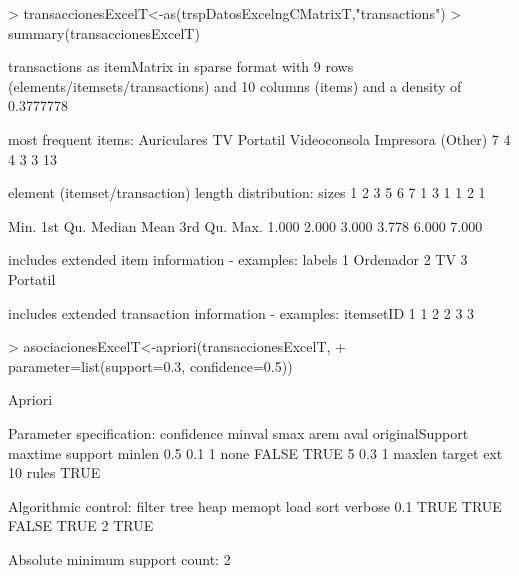 \documentclass [a4paper] {article}
\begin{document}
\begin{Schunk}
\begin{Sinput}
> transaccionesExcelT<-as(trspDatosExcelngCMatrixT,"transactions")
> summary(transaccionesExcelT)
\end{Sinput}
\begin{Soutput}
transactions as itemMatrix in sparse format with
 9 rows (elements/itemsets/transactions) and
 10 columns (items) and a density of 0.3777778 

most frequent items:
 Auriculares           TV     Portatil Videoconsola    Impresora      (Other) 
           7            4            4            3            3           13 

element (itemset/transaction) length distribution:
sizes
1 2 3 5 6 7 
1 3 1 1 2 1 

   Min. 1st Qu.  Median    Mean 3rd Qu.    Max. 
  1.000   2.000   3.000   3.778   6.000   7.000 

includes extended item information - examples:
     labels
1 Ordenador
2        TV
3  Portatil

includes extended transaction information - examples:
  itemsetID
1         1
2         2
3         3
\end{Soutput}
\begin{Sinput}
> asociacionesExcelT<-apriori(transaccionesExcelT,
+ parameter=list(support=0.3, confidence=0.5))
\end{Sinput}
\begin{Soutput}
Apriori

Parameter specification:
 confidence minval smax arem  aval originalSupport maxtime support minlen
        0.5    0.1    1 none FALSE            TRUE       5     0.3      1
 maxlen target  ext
     10  rules TRUE

Algorithmic control:
 filter tree heap memopt load sort verbose
    0.1 TRUE TRUE  FALSE TRUE    2    TRUE

Absolute minimum support count: 2 


\end{Soutput}
\end{Schunk}
\end{document}
